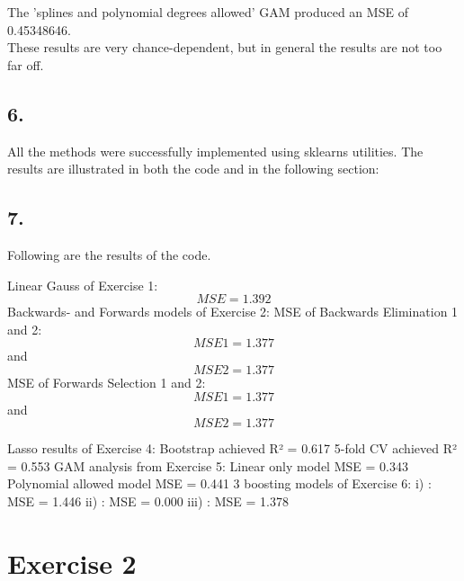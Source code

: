 \documentclass[]{article}
\begin{document}
The 'splines and polynomial degrees allowed' GAM produced an MSE of 0.45348646.\\

These results are very chance-dependent, but in general the results are not too far off.

\subsection*{6.}
All the methods were successfully implemented using sklearns utilities. The results are illustrated in both the code and in the following section:

\subsection*{7.}
Following are the results of the code.


Linear Gauss of Exercise 1:
$$
MSE = 1.392
$$
Backwards- and Forwards models of Exercise 2:
MSE of Backwards Elimination 1 and 2:
$$
MSE1 = 1.377 
$$
and 
$$
MSE2 = 1.377
$$
MSE of Forwards Selection 1 and 2:
$$
MSE1 = 1.377
$$ 
and 
$$
MSE2 = 1.377
$$

Lasso results of Exercise 4:
Bootstrap achieved R² = 0.617
5-fold CV achieved R² = 0.553
GAM analysis from Exercise 5:
Linear only model MSE = 0.343
Polynomial allowed model MSE = 0.441
3 boosting models of Exercise 6:
i)   : MSE = 1.446
ii)  : MSE = 0.000
iii) : MSE = 1.378


\section*{Exercise 2}
\end{document}

